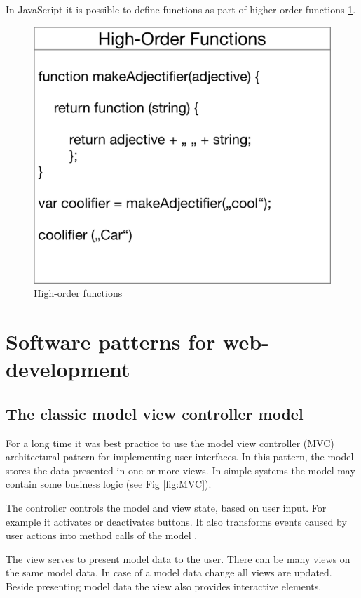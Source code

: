 In JavaScript it is possible to define functions as part of higher-order functions  \ref{fig:HF}. 

\begin{figure}[H]
	\centering
	\includegraphics[scale=0.6]{bilder/grundlagen/fp1.png}
	\caption{High-order functions}
	\label{fig:HF}
\end{figure}

\section{Software patterns for web-development}

\subsection{The classic model view controller model}

For a long time it was best practice to use the model view controller (MVC) architectural 
pattern for implementing user interfaces.
In this pattern, the model stores the data 
presented in one or more views. In simple systems the model may contain some
 business logic (see Fig \ref{fig:MVC}).

The controller controls the model and view state, based on user input.
For example it activates or deactivates buttons.
 It also transforms events caused by user actions into method calls of the model 
\cite{GOLL}. 
 
The view serves to present model data to the user. There can be many views on the 
same model data. In case of a model data change all views are updated. 
Beside presenting model data the view also provides interactive elements.

